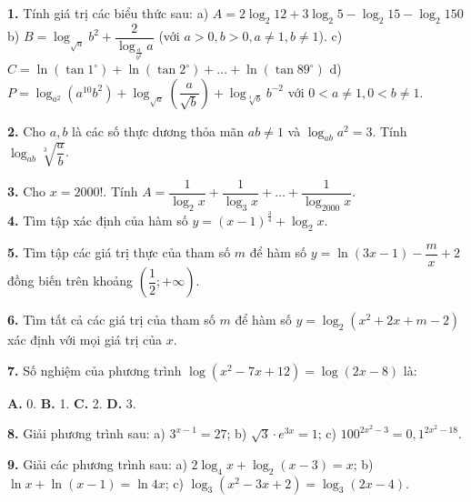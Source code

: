 \documentclass[12pt,a4paper]{extarticle}
\begin{document}
\noindent\textbf{1.} Tính giá trị các biểu thức sau:
\noindent a) $A = 2\log_2 12 + 3\log_2 5 - \log_2 15 - \log_2 150$
\noindent b) $B = \log_{\sqrt{a}} b^2 + \dfrac{2}{\log_{\frac{a}{b^2}} a}$ (với $a > 0, b > 0, a \ne 1, b \ne 1$).
\noindent c) $C = \ln(\tan 1^\circ) + \ln(\tan 2^\circ) + \dots + \ln(\tan 89^\circ)$
\noindent d) $P = \log_{a^2}(a^{10}b^2) + \log_{\sqrt{a}}\left(\dfrac{a}{\sqrt{b}}\right) + \log_{\sqrt[3]{b}} b^{-2}$ với $0 < a \ne 1, 0 < b \ne 1$.
\vspace{0.4cm}

\noindent\textbf{2.} Cho $a, b$ là các số thực dương thỏa mãn $ab \ne 1$ và $\log_{ab} a^2 = 3$. Tính $\log_{ab} \sqrt[3]{\dfrac{a}{b}}$.
\vspace{0.4cm}

\noindent\textbf{3.} Cho $x = 2000!$. Tính $A = \dfrac{1}{\log_2 x} + \dfrac{1}{\log_3 x} + \dots + \dfrac{1}{\log_{2000} x}$.\\

\noindent\textbf{4.} Tìm tập xác định của hàm số $y = (x - 1)^{\frac{3}{4}} + \log_2 x$.
\vspace{0.4cm}

\noindent\textbf{5.} Tìm tập các giá trị thực của tham số $m$ để hàm số $y = \ln(3x - 1) - \dfrac{m}{x} + 2$ đồng biến trên khoảng $\left(\dfrac{1}{2}; +\infty\right)$.
\vspace{0.2cm}


\noindent\textbf{6.} Tìm tất cả các giá trị của tham số $m$ để hàm số $y = \log_2(x^2 + 2x + m - 2)$ xác định với mọi giá trị của $x$.

\noindent\textbf{7.} Số nghiệm của phương trình $\log(x^2 - 7x + 12) = \log(2x - 8)$ là:
\vspace{0.2cm}

\noindent\textbf{A.} 0. \hfill \textbf{B.} 1. \hfill \textbf{C.} 2. \hfill \textbf{D.} 3.
\vspace{0.4cm}

\noindent\textbf{8.} Giải phương trình sau:
\noindent a) $3^{x-1} = 27$;
\noindent b) $\sqrt{3} \cdot e^{3x} = 1$;
\noindent c) $100^{2x^2 - 3} = 0{,}1^{2x^2 - 18}$.
\vspace{0.4cm}

\noindent\textbf{9.} Giải các phương trình sau:
\noindent a) $2\log_4 x + \log_2(x - 3) = x$;
\noindent b) $\ln x + \ln(x - 1) = \ln 4x$;
\noindent c) $\log_3(x^2 - 3x + 2) = \log_3(2x - 4)$.

\newpage
{}
\end{document}
